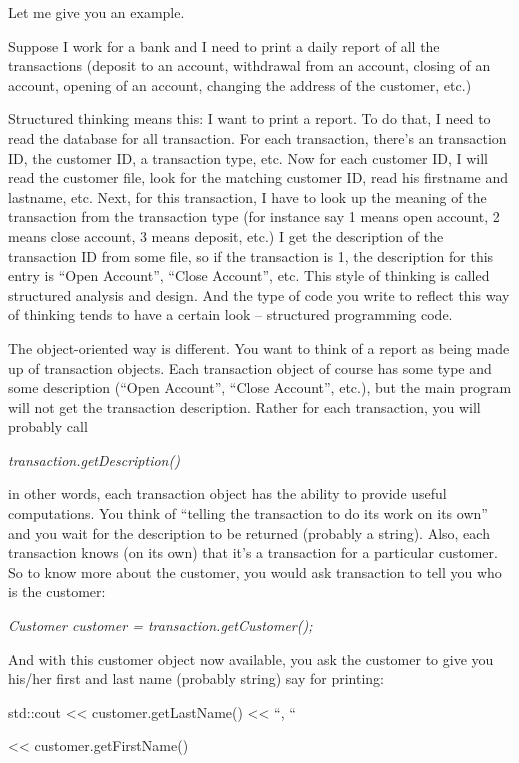 \documentclass[
]{article}
\begin{document}
Let me give you an example.

Suppose I work for a bank and I need to print a daily report of all the
transactions (deposit to an account, withdrawal from an account, closing
of an account, opening of an account, changing the address of the
customer, etc.)

Structured thinking means this: I want to print a report. To do that, I
need to read the database for all transaction. For each transaction,
there's an transaction ID, the customer ID, a transaction type, etc. Now
for each customer ID, I will read the customer file, look for the
matching customer ID, read his firstname and lastname, etc. Next, for
this transaction, I have to look up the meaning of the transaction from
the transaction type (for instance say 1 means open account, 2 means
close account, 3 means deposit, etc.) I get the description of the
transaction ID from some file, so if the transaction is 1, the
description for this entry is ``Open Account'', ``Close Account'', etc.
This style of thinking is called structured analysis and design. And the
type of code you write to reflect this way of thinking tends to have a
certain look -- structured programming code.

The object-oriented way is different. You want to think of a report as
being made up of transaction objects. Each transaction object of course
has some type and some description (``Open Account'', ``Close Account'',
etc.), but the main program will not get the transaction description.
Rather for each transaction, you will probably call

\emph{transaction.getDescription()}

in other words, each transaction object has the ability to provide
useful computations. You think of ``telling the transaction to do its
work on its own'' and you wait for the description to be returned
(probably a string). Also, each transaction knows (on its own) that it's
a transaction for a particular customer. So to know more about the
customer, you would ask transaction to tell you who is the customer:

\emph{Customer customer = transaction.getCustomer();}

And with this customer object now available, you ask the customer to
give you his/her first and last name (probably string) say for printing:

std::cout \textless\textless{} customer.getLastName()
\textless\textless{} ``, ``

\textless\textless{} customer.getFirstName()
\end{document}
